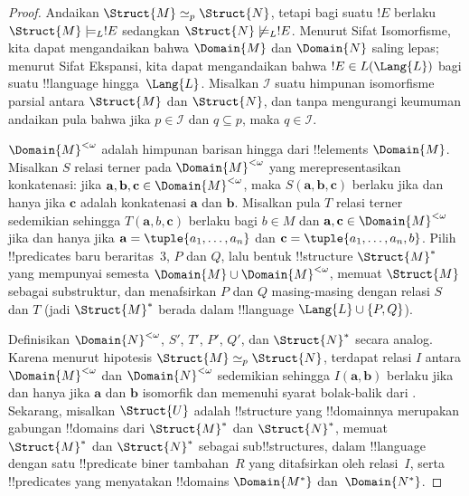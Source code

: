 \documentclass[../../../include/open-logic-section]{subfiles}
\begin{document}
\begin{proof}
Andaikan $\Struct{M} \simeq_p \Struct{N}$, tetapi bagi suatu $!E$ berlaku
$\Struct{M} \models_L !E$ sedangkan $\Struct{N} \not\models_L !E$. Menurut
Sifat Isomorfisme, kita dapat mengandaikan bahwa $\Domain{M}$ dan
$\Domain{N}$ saling lepas; menurut Sifat Ekspansi, kita dapat mengandaikan
bahwa $!E \in L(\Lang{L})$ bagi suatu !!{language} hingga~$\Lang{L}$.
Misalkan $\mathcal{I}$ suatu himpunan isomorfisme parsial antara
$\Struct{M}$ dan $\Struct{N}$, dan tanpa mengurangi keumuman andaikan pula
bahwa jika $p \in \mathcal{I}$ dan $q \subseteq p$, maka $q \in
\mathcal{I}$.

$\Domain{M}^{<\omega}$ adalah himpunan barisan hingga dari !!{element}s
$\Domain{M}$. Misalkan $S$ relasi terner pada $\Domain{M}^{<\omega}$ yang
merepresentasikan konkatenasi: jika $\mathbf{a}, \mathbf{b}, \mathbf{c} \in
\Domain{M}^{<\omega}$, maka $S(\mathbf{a}, \mathbf{b}, \mathbf{c})$ berlaku
jika dan hanya jika $\mathbf{c}$ adalah konkatenasi $\mathbf{a}$ dan
$\mathbf{b}$. Misalkan pula $T$ relasi terner sedemikian sehingga
$T(\mathbf{a}, b, \mathbf{c})$ berlaku bagi $b \in M$ dan $\mathbf{a},
\mathbf{c} \in \Domain{M}^{<\omega}$ jika dan hanya jika $\mathbf{a} =
\tuple{a_1, \dots, a_n}$ dan $\mathbf{c} = \tuple{a_1, \dots, a_n, b}$.
Pilih !!{predicate}s baru beraritas~3, $P$ dan $Q$, lalu bentuk
!!{structure} $\Struct{M}^*$ yang mempunyai semesta $\Domain{M} \cup
\Domain{M}^{<\omega}$, memuat $\Struct{M}$ sebagai substruktur, dan
menafsirkan $P$ dan $Q$ masing-masing dengan relasi $S$ dan $T$ (jadi
$\Struct{M}^*$ berada dalam !!{language} $\Lang{L} \cup \{ P, Q\}$).

Definisikan $\Domain{N}^{<\omega}$, $S'$, $T'$, $P'$, $Q'$, dan
$\Struct{N}^*$ secara analog. Karena menurut hipotesis $\Struct{M}
\simeq_p \Struct{N}$, terdapat relasi $I$ antara $\Domain{M}^{<\omega}$
dan $\Domain{N}^{<\omega}$ sedemikian sehingga $I(\mathbf{a}, \mathbf{b})$
berlaku jika dan hanya jika $\mathbf{a}$ dan $\mathbf{b}$ isomorfik dan
memenuhi syarat bolak-balik dari .
Sekarang, misalkan $\Struct{U}$ adalah !!{structure} yang !!{domain}nya
merupakan gabungan !!{domain}s dari $\Struct{M}^*$ dan $\Struct{N}^*$,
memuat $\Struct{M}^*$ dan $\Struct{N}^*$ sebagai sub!!{structure}s, dalam
!!{language} dengan satu !!{predicate} biner tambahan~$R$ yang ditafsirkan
oleh relasi~$I$, serta !!{predicate}s yang menyatakan !!{domain}s
$\Domain{M^*}$ dan~$\Domain{N^*}$.


\end{proof}
\end{document}
